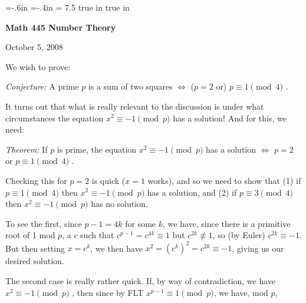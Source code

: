 





\loadmsbm

\nopagenumbers
\parindent=0pt

\voffset=-.6in
\hoffset=-.4in
\hsize = 7.5 true in
 true in


\overfullrule=0pt


\def\ctln{\centerline}
\def\u{\underbar}
\def\ssk{\smallskip}
\def\msk{\medskip}
\def\bsk{\bigskip}


\ctln{\bf Math 445 Number Theory}

\medskip

\ctln{October 5, 2008}

\bigskip


We wish to prove:

\ssk

{\it Conjecture:} A prime $p$ is a sum of two squares $\Leftrightarrow$ ($p=2$ or) $p\equiv 1\pmod{4}$ . 

\ssk

It turns out that what is really relevant to the discussion is under what circumstances the equation
$x^2\equiv -1\pmod{p}$ has a solution! And for this, we need:

\ssk

{\it Theorem:} If $p$ is prime, the equation $x^2\equiv -1\pmod{p}$ has a solution $\Leftrightarrow$ $p=2$ or $p\equiv 1\pmod{4}$ .

\ssk

Checking this for $p=2$ is quick ($x=1$ works), and so we need to show that 
(1) if $p\equiv 1\pmod{4}$ then $x^2\equiv -1\pmod{p}$ has a solution, and
(2) if $p\equiv 3\pmod{4}$ then $x^2\equiv -1\pmod{p}$ has no solution. 

\ssk

To see the first, since $p-1=4k$ for some $k$, we have, since there is a primitive root of 1 mod $p$, 
a $c$ such that $\displaystyle c^{p-1}=c^{4k}\equiv 1$ but $\displaystyle c^{2k}\not\equiv 1$,
so (by Euler) $c^{2k}\equiv -1$. But then setting $x=c^k$, we then have $x^2=(c^k)^2=c^{2k}\equiv -1$,
giving us our desired solution.


The second case is really rather quick. If, by way of contradiction, we have $x^2\equiv -1\pmod{p}$ , 
then since by FLT $x^{p-1}\equiv 1\pmod{p}$, we have, mod $p$,

\ssk

